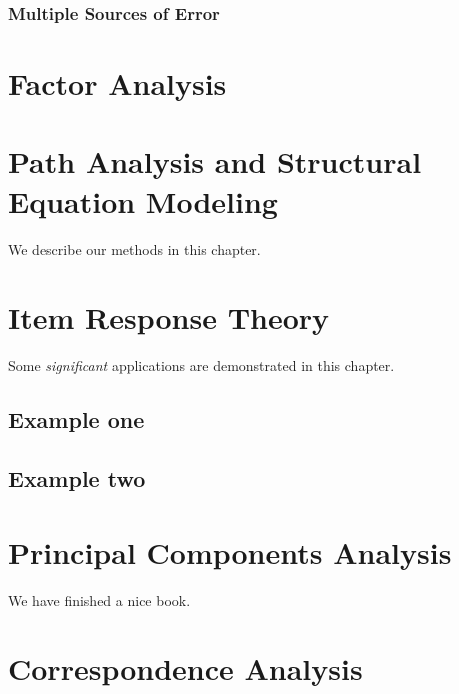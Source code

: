 \documentclass[
]{book}
\begin{document}
\hypertarget{multiple-sources-of-error}{%
\subsection{Multiple Sources of Error}\label{multiple-sources-of-error}}

\hypertarget{factor-analysis}{%
\chapter{Factor Analysis}\label{factor-analysis}}

\hypertarget{path-analysis-and-structural-equation-modeling}{%
\chapter{Path Analysis and Structural Equation Modeling}\label{path-analysis-and-structural-equation-modeling}}

We describe our methods in this chapter.

\hypertarget{item-response-theory}{%
\chapter{Item Response Theory}\label{item-response-theory}}

Some \emph{significant} applications are demonstrated in this chapter.

\hypertarget{example-one}{%
\section{Example one}\label{example-one}}

\hypertarget{example-two}{%
\section{Example two}\label{example-two}}

\hypertarget{principal-components-analysis}{%
\chapter{Principal Components Analysis}\label{principal-components-analysis}}

We have finished a nice book.

\hypertarget{correspondence-analysis}{%
\chapter{Correspondence Analysis}\label{correspondence-analysis}}
\end{document}
